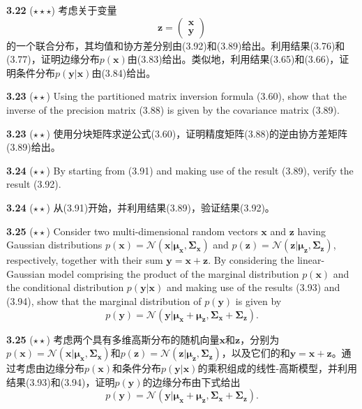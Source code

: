 \documentclass{article}
\begin{document}
\textbf{3.22} ($\star\star\star$) 考虑关于变量
\begin{equation}
\mathbf{z} = \begin{pmatrix} \mathbf{x} \\ \mathbf{y} \end{pmatrix} \tag{3.211}
\end{equation}
的一个联合分布，其均值和协方差分别由(3.92)和(3.89)给出。利用结果(3.76)和(3.77)，证明边缘分布$p(\mathbf{x})$由(3.83)给出。类似地，利用结果(3.65)和(3.66)，证明条件分布$p(\mathbf{y}|\mathbf{x})$由(3.84)给出。

\textbf{3.23} ($\star\star$) Using the partitioned matrix inversion formula (3.60), show that the inverse of the precision matrix (3.88) is given by the covariance matrix (3.89).

\textbf{3.23} ($\star\star$) 使用分块矩阵求逆公式(3.60)，证明精度矩阵(3.88)的逆由协方差矩阵(3.89)给出。

\textbf{3.24} ($\star\star$) By starting from (3.91) and making use of the result (3.89), verify the result (3.92).

\textbf{3.24} ($\star\star$) 从(3.91)开始，并利用结果(3.89)，验证结果(3.92)。

\textbf{3.25} ($\star\star$) Consider two multi-dimensional random vectors $\mathbf{x}$ and $\mathbf{z}$ having Gaussian distributions $p(\mathbf{x}) = \mathcal{N}(\mathbf{x}|\boldsymbol{\mu}_{\mathbf{x}}, \boldsymbol{\Sigma}_{\mathbf{x}})$ and $p(\mathbf{z}) = \mathcal{N}(\mathbf{z}|\boldsymbol{\mu}_{\mathbf{z}}, \boldsymbol{\Sigma}_{\mathbf{z}})$, respectively, together with their sum $\mathbf{y} = \mathbf{x} + \mathbf{z}$. By considering the linear-Gaussian model comprising the product of the marginal distribution $p(\mathbf{x})$ and the conditional distribution $p(\mathbf{y}|\mathbf{x})$ and making use of the results (3.93) and (3.94), show that the marginal distribution of $p(\mathbf{y})$ is given by
\begin{equation}
p(\mathbf{y}) = \mathcal{N}(\mathbf{y}|\boldsymbol{\mu}_{\mathbf{x}} + \boldsymbol{\mu}_{\mathbf{z}}, \boldsymbol{\Sigma}_{\mathbf{x}} + \boldsymbol{\Sigma}_{\mathbf{z}}). \tag{3.212}
\end{equation}

\textbf{3.25} ($\star\star$) 考虑两个具有多维高斯分布的随机向量$\mathbf{x}$和$\mathbf{z}$，分别为$p(\mathbf{x}) = \mathcal{N}(\mathbf{x}|\boldsymbol{\mu}_{\mathbf{x}}, \boldsymbol{\Sigma}_{\mathbf{x}})$和$p(\mathbf{z}) = \mathcal{N}(\mathbf{z}|\boldsymbol{\mu}_{\mathbf{z}}, \boldsymbol{\Sigma}_{\mathbf{z}})$，以及它们的和$\mathbf{y} = \mathbf{x} + \mathbf{z}$。通过考虑由边缘分布$p(\mathbf{x})$和条件分布$p(\mathbf{y}|\mathbf{x})$的乘积组成的线性-高斯模型，并利用结果(3.93)和(3.94)，证明$p(\mathbf{y})$的边缘分布由下式给出
\begin{equation}
p(\mathbf{y}) = \mathcal{N}(\mathbf{y}|\boldsymbol{\mu}_{\mathbf{x}} + \boldsymbol{\mu}_{\mathbf{z}}, \boldsymbol{\Sigma}_{\mathbf{x}} + \boldsymbol{\Sigma}_{\mathbf{z}}). \tag{3.212}
\end{equation}
\end{document}
